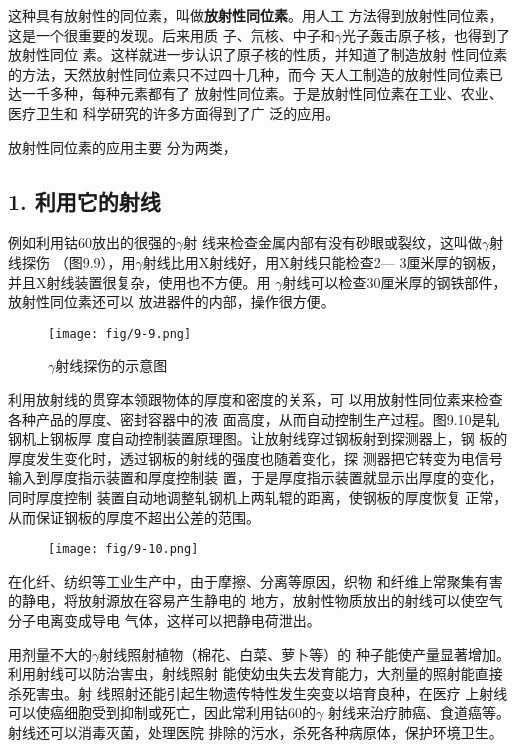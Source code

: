 这种具有放射性的同位素，叫做\textbf{放射性同位素}。用人工
方法得到放射性同位素，这是一个很重要的发现。后来用质
子、氘核、中子和$\gamma$光子轰击原子核，也得到了放射性同位
素。这样就进一步认识了原子核的性质，并知道了制造放射
性同位素的方法，天然放射性同位素只不过四十几种，而今
天人工制造的放射性同位素已
达一千多种，每种元素都有了
放射性同位素。于是放射性同位素在工业、农业、医疗卫生和
科学研究的许多方面得到了广
泛的应用。

放射性同位素的应用主要
分为两类，

\subsection*{1. 利用它的射线}

例如利用钴60放出的很强的$\gamma$射
线来检查金属内部有没有砂眼或裂纹，这叫做$\gamma$射线探伤
（图9.9），用$\gamma$射线比用X射线好，用X射线只能检查2—
3厘米厚的钢板，并且X射线装置很复杂，使用也不方便。用
$\gamma$射线可以检查30厘米厚的钢铁部件，放射性同位素还可以
放进器件的内部，操作很方便。
\begin{figure}[htp]\centering
\texttt{[image: fig/9-9.png]}
\caption{$\gamma$射线探伤的示意图}
\end{figure}

利用放射线的贯穿本领跟物体的厚度和密度的关系，可
以用放射性同位素来检查各种产品的厚度、密封容器中的液
面高度，从而自动控制生产过程。图9.10是轧钢机上钢板厚
度自动控制装置原理图。让放射线穿过钢板射到探测器上，钢
板的厚度发生变化时，透过钢板的射线的强度也随着变化，探
测器把它转变为电信号输入到厚度指示装置和厚度控制装
置，于是厚度指示装置就显示出厚度的变化，同时厚度控制
装置自动地调整轧钢机上两轧辊的距离，使钢板的厚度恢复
正常，从而保证钢板的厚度不超出公差的范围。
\begin{figure}[htp]\centering
\texttt{[image: fig/9-10.png]}
\caption{}
\end{figure}

在化纤、纺织等工业生产中，由于摩擦、分离等原因，织物
和纤维上常聚集有害的静电，将放射源放在容易产生静电的
地方，放射性物质放出的射线可以使空气分子电离变成导电
气体，这样可以把静电荷泄出。

用剂量不大的$\gamma$射线照射植物（棉花、白菜、萝卜等）的
种子能使产量显著增加。利用射线可以防治害虫，射线照射
能使幼虫失去发育能力，大剂量的照射能直接杀死害虫。射
线照射还能引起生物遗传特性发生突变以培育良种，在医疗
上射线可以使癌细胞受到抑制或死亡，因此常利用钴60的$\gamma$
射线来治疗肺癌、食道癌等。射线还可以消毒灭菌，处理医院
排除的污水，杀死各种病原体，保护环境卫生。

